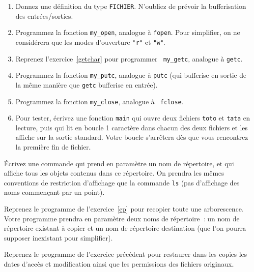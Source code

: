 \begin {enumerate}
    \item Donnez une définition du type {\tt FICHIER}.  N'oubliez de
	prévoir la bufferisation des entrées/sorties.

    \item Programmez la fonction {\tt my\_open}, analogue à {\tt fopen}.
	Pour simplifier, on ne considérera que les modes d'ouverture
	\verb|"r"| et \verb|"w"|.

    \item Reprenez l'exercice~\ref {getchar} pour programmer {\tt
	my\_getc}, analogue à {\tt getc}.

    \item Programmez la fonction {\tt my\_putc}, analogue à {\tt putc}
	(qui bufferise en sortie de la même manière que \texttt {getc}
	bufferise en entrée).

    \item Programmez la fonction {\tt my\_close}, analogue à {\tt
	fclose}.

    \item Pour tester, écrivez une fonction \texttt {main} qui ouvre
	deux fichiers \texttt{toto} et \texttt{tata} en lecture, puis
	qui lit en boucle 1 caractère dans chacun des deux fichiers
	et les affiche sur la sortie standard. Votre boucle s'arrêtera
	dès que vous rencontrez la première fin de fichier.

\end {enumerate}



\question

Écrivez une commande qui prend en paramètre un nom de répertoire, et
qui affiche tous les objets contenus dans ce répertoire. On prendra les
mêmes conventions de restriction d'affichage que la commande {\tt ls}
(pas d'affichage des noms commençant par un point).


\question

Reprenez le programme de l'exercice~\ref {cp} pour recopier toute
une arborescence. Votre programme prendra en paramètre deux noms
de répertoire~: un nom de répertoire existant à copier et un nom
de répertoire destination (que l'on pourra supposer inexistant pour
simplifier).


\question

Reprenez le programme de l'exercice précédent pour restaurer dans les
copies les dates d'accès et modification ainsi que les permissions des
fichiers originaux.


\question

